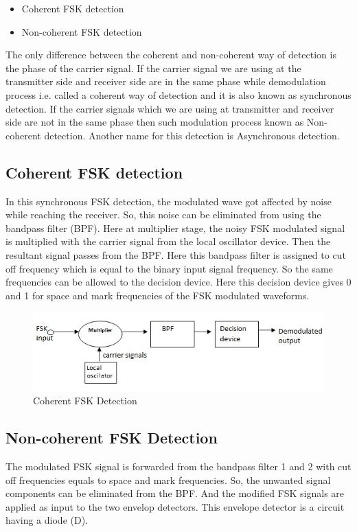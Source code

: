 \documentclass{report}
\begin{document}
	\begin{itemize}
		\item Coherent FSK detection
		\item Non-coherent FSK detection
	\end{itemize}

	The only difference between the coherent and non-coherent way of detection is the phase of the carrier signal. If the carrier signal we are using at the transmitter side and receiver side are in the same phase while demodulation process i.e. called a coherent way of detection and it is also known as synchronous detection. If the carrier signals which we are using at transmitter and receiver side are not in the same phase then such modulation process known as Non-coherent detection. Another name for this detection is Asynchronous detection.
	
	\subsection{Coherent FSK detection}
	In this synchronous FSK detection, the modulated wave got affected by noise while reaching the receiver. So, this noise can be eliminated from using the bandpass filter (BPF). Here at multiplier stage, the noisy FSK modulated signal is multiplied with the carrier signal from the local oscillator device. Then the resultant signal passes from the BPF. Here this bandpass filter is assigned to cut off frequency which is equal to the binary input signal frequency. So the same frequencies can be allowed to the decision device. Here this decision device gives 0 and 1 for space and mark frequencies of the FSK modulated waveforms.
	
	\begin{figure}[H]
		\centering
		\includegraphics[width=\linewidth]{images/coherent_fsk.png}
		\caption{Coherent FSK Detection}
		\label{fig:}
	\end{figure}

	\subsection{Non-coherent FSK Detection}
	\bigskip
	The modulated FSK signal is forwarded from the bandpass filter 1 and 2 with cut off frequencies equals to space and mark frequencies. So, the unwanted signal components can be eliminated from the BPF. And the modified FSK signals are applied as input to the two envelop detectors. This envelope detector is a circuit having a diode (D).
	
\end{document}
